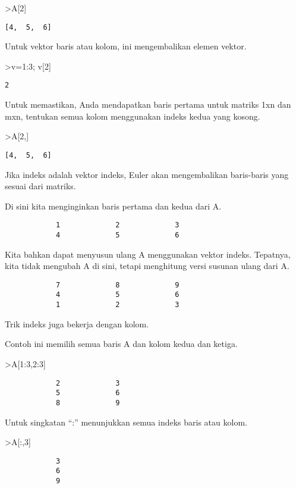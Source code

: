 \documentclass[
]{book}
\begin{document}
\textgreater A{[}2{]}

\begin{verbatim}
[4,  5,  6]
\end{verbatim}

Untuk vektor baris atau kolom, ini mengembalikan elemen vektor.

\textgreater v=1:3; v{[}2{]}

\begin{verbatim}
2
\end{verbatim}

Untuk memastikan, Anda mendapatkan baris pertama untuk matriks 1xn dan mxn, tentukan semua kolom menggunakan indeks kedua yang kosong.

\textgreater A{[}2,{]}

\begin{verbatim}
[4,  5,  6]
\end{verbatim}

Jika indeks adalah vektor indeks, Euler akan mengembalikan baris-baris yang sesuai dari matriks.

Di sini kita menginginkan baris pertama dan kedua dari A.

\begin{verbatim}
            1             2             3 
            4             5             6 
\end{verbatim}

Kita bahkan dapat menyusun ulang A menggunakan vektor indeks. Tepatnya, kita tidak mengubah A di sini, tetapi menghitung versi susunan ulang dari A.

\begin{verbatim}
            7             8             9 
            4             5             6 
            1             2             3 
\end{verbatim}

Trik indeks juga bekerja dengan kolom.

Contoh ini memilih semua baris A dan kolom kedua dan ketiga.

\textgreater A{[}1:3,2:3{]}

\begin{verbatim}
            2             3 
            5             6 
            8             9 
\end{verbatim}

Untuk singkatan ``:'' menunjukkan semua indeks baris atau kolom.

\textgreater A{[}:,3{]}

\begin{verbatim}
            3 
            6 
            9 
\end{verbatim}
\end{document}
